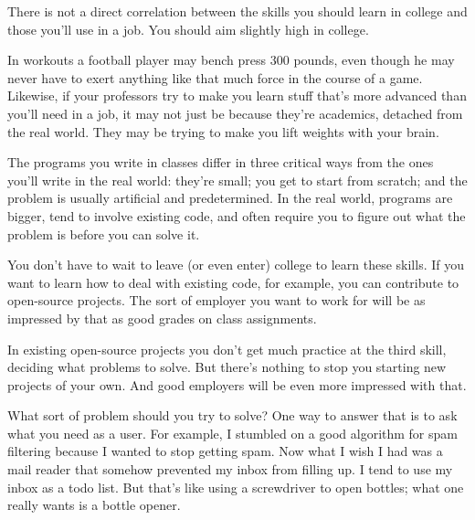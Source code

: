 There is
                    not a direct correlation between the skills you should learn
                    in college and those you'll use in a job. You should aim
                    slightly high in college.

In workouts a football
                    player may bench press 300 pounds, even though he may never
                    have to exert anything like that much force in the course of
                    a game. Likewise, if your professors try to make you learn
                    stuff that's more advanced than you'll need in a job, it may
                    not just be because they're academics, detached from the
                    real world. They may be trying to make you lift weights with
                    your brain.

The programs you write in classes
                    differ in three critical ways from the ones you'll write in
                    the real world: they're small; you get to start from
                    scratch; and the problem is usually artificial and
                    predetermined. In the real world, programs are bigger, tend
                    to involve existing code, and often require you to figure
                    out what the problem is before you can solve it.

You
                    don't have to wait to leave (or even enter) college to learn
                    these skills. If you want to learn how to deal with existing
                    code, for example, you can contribute to open-source
                    projects. The sort of employer you want to work for will be
                    as impressed by that as good grades on class assignments.

In
                    existing open-source projects you don't get much practice at
                    the third skill, deciding what problems to solve. But
                    there's nothing to stop you starting new projects of your
                    own. And good employers will be even more impressed with
                    that.

What sort of problem should you try to
                    solve? One way to answer that is to ask what you need as a
                    user. For example, I stumbled on a good algorithm for spam
                    filtering because I wanted to stop getting spam. Now what I
                    wish I had was a mail reader that somehow prevented my inbox
                    from filling up. I tend to use my inbox as a todo list. But
                    that's like using a screwdriver to open bottles; what one
                    really wants is a bottle opener.

